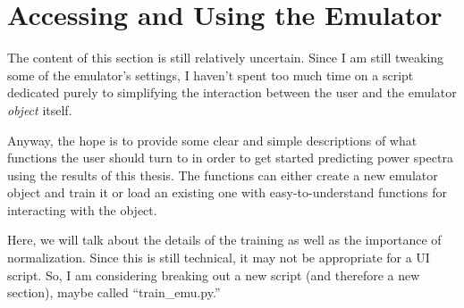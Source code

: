 \section{Accessing and Using the Emulator}


The content of this section is still relatively uncertain. Since I am still tweaking some of the emulator's settings, I haven't spent too much time on a script dedicated purely to simplifying the interaction between the user and the emulator \textit{object} itself.

Anyway, the hope is to provide some clear and simple descriptions of what functions the user should turn to in order to get started predicting power spectra using the results of this thesis. The functions can either create a new emulator object and train it or load an existing one with easy-to-understand functions for interacting with the object.

Here, we will talk about the details of the training as well as the importance of normalization. Since this is still technical, it may not be appropriate for a UI script. So, I am considering breaking out a new script (and therefore a new section), maybe called ``train\_emu.py.''
